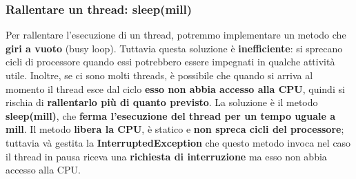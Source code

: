 \documentclass[12pt]{article}
\begin{document}
\subsubsection{Rallentare un thread: sleep(mill)}
Per rallentare l'esecuzione di un thread, potremmo implementare un metodo che \textbf{giri a vuoto} (busy loop). Tuttavia questa soluzione è \textbf{inefficiente}: si sprecano cicli di processore quando essi potrebbero essere impegnati in qualche attività utile. Inoltre, se ci sono molti threads, è possibile che quando si arriva al momento il thread esce dal ciclo \textbf{esso non abbia accesso alla CPU}, quindi si rischia di \textbf{rallentarlo più di quanto previsto}. La soluzione è il metodo \textbf{sleep(mill)}, che \textbf{ferma l'esecuzione del thread per un tempo uguale a mill}. Il metodo \textbf{libera la CPU}, è statico e \textbf{non spreca cicli del processore}; tuttavia và gestita la \textbf{InterruptedException} che questo metodo invoca nel caso il thread in pausa riceva una \textbf{richiesta di interruzione} ma esso non abbia accesso alla CPU.
\end{document}
